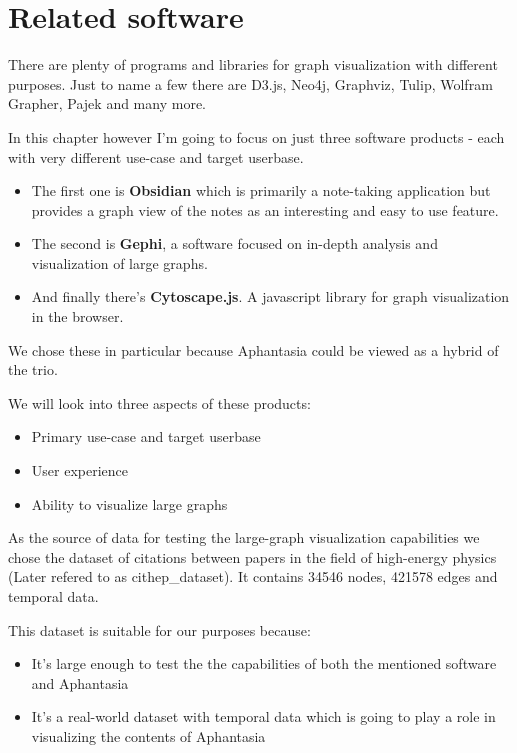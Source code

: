 \chapter{Related software}

There are plenty of programs and libraries for \gls{graph} visualization with different purposes.
Just to name a few there are D3.js, Neo4j, Graphviz, Tulip, Wolfram Grapher, Pajek and many more.

In this chapter however I'm going to focus on just three software products - each with very different use-case and target userbase.

\begin{itemize}

\item The first one is \textbf{Obsidian} which is primarily a note-taking application
but provides a graph view of the notes as an interesting and easy to use feature. 

\item The second is \textbf{Gephi}, a software focused on in-depth analysis and visualization of large graphs.

\item And finally there's \textbf{Cytoscape.js}. A javascript library for graph visualization in the browser.

\end{itemize}

We chose these in particular because Aphantasia could be viewed as a hybrid of the trio.

We will look into three aspects of these products:
\begin{itemize}
  \item Primary use-case and target userbase
  \item User experience
  \item Ability to visualize large graphs
\end{itemize}

As the source of data for testing the large-graph visualization capabilities we chose the dataset of citations between papers
in the field of high-energy physics \cite{snap_cit_hep} (Later refered to as \gls{cithep_dataset}).
It contains 34546 nodes, 421578 edges and temporal data.

This dataset is suitable for our purposes because:
\begin{itemize}
  \item It's large enough to test the the capabilities of both the mentioned software and Aphantasia
  \item It's a real-world dataset with temporal data which is going to play a role in visualizing the contents of Aphantasia
\end{itemize}

